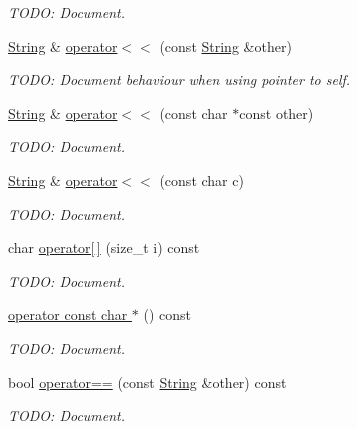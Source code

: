 \begin{DoxyCompactItemize}
\begin{DoxyCompactList}\small\item\em T\+O\+DO\+: Document. \end{DoxyCompactList}\item 
\hyperlink{class_power_1_1_string}{String} \& \hyperlink{class_power_1_1_string_a0e79c36bc1ac080cdc9bbe491cea5b32}{operator$<$$<$} (const \hyperlink{class_power_1_1_string}{String} \&other)
\begin{DoxyCompactList}\small\item\em T\+O\+DO\+: Document behaviour when using pointer to self. \end{DoxyCompactList}\item 
\hyperlink{class_power_1_1_string}{String} \& \hyperlink{class_power_1_1_string_a736113857946d87afa440b5f7c758087}{operator$<$$<$} (const char $\ast$const other)
\begin{DoxyCompactList}\small\item\em T\+O\+DO\+: Document. \end{DoxyCompactList}\item 
\hyperlink{class_power_1_1_string}{String} \& \hyperlink{class_power_1_1_string_af89ae1a7a705b6667290a08b911e3971}{operator$<$$<$} (const char c)
\begin{DoxyCompactList}\small\item\em T\+O\+DO\+: Document. \end{DoxyCompactList}\item 
char \hyperlink{class_power_1_1_string_a9205107e5478a19d5f54cf0db0677be4}{operator\mbox{[}$\,$\mbox{]}} (size\+\_\+t i) const
\begin{DoxyCompactList}\small\item\em T\+O\+DO\+: Document. \end{DoxyCompactList}\item 
\hyperlink{class_power_1_1_string_acf417d8914b4ae725691e8cd08b2911a}{operator const char $\ast$} () const
\begin{DoxyCompactList}\small\item\em T\+O\+DO\+: Document. \end{DoxyCompactList}\item 
bool \hyperlink{class_power_1_1_string_ae4616e12ee74fcb4f86ffaa15560854b}{operator==} (const \hyperlink{class_power_1_1_string}{String} \&other) const
\begin{DoxyCompactList}\small\item\em T\+O\+DO\+: Document. \end{DoxyCompactList}\item 

\end{DoxyCompactItemize}
